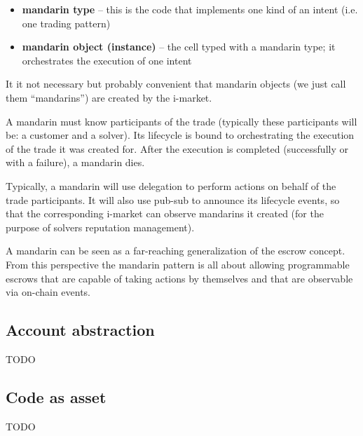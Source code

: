 \documentclass[a4paper]{article}
\begin{document}
\begin{itemize}
  \item \textbf{mandarin type} -- this is the code that implements one kind of an intent (i.e. one trading pattern)
  \item \textbf{mandarin object (instance)} -- the cell typed with a mandarin type; it orchestrates the execution of one intent
\end{itemize}

It it not necessary but probably convenient that mandarin objects (we just call them ``mandarins'') are created by the i-market.

A mandarin must know participants of the trade (typically these participants will be: a customer and a solver). Its lifecycle is bound to orchestrating the execution of the trade it was created for. After the execution is completed (successfully or with a failure), a mandarin dies.

Typically, a mandarin will use delegation to perform actions on behalf of the trade participants. It will also use pub-sub to announce its lifecycle events, so that the corresponding i-market can observe mandarins it created (for the purpose of solvers reputation management).

A mandarin can be seen as a far-reaching generalization of the escrow concept. From this perspective the mandarin pattern is all about allowing programmable escrows that are capable of taking actions by themselves and that are observable via on-chain events.

\subsection{Account abstraction}

TODO

\subsection{Code as asset}

TODO

\newpage

\begin{appendices}

\makeatletter
\renewcommand{\@seccntformat}[1]{%
  \@ifundefined{#1name}{}{\csname #1name\endcsname~}%
  \csname the#1\endcsname: }
\makeatother



\newpage



\newpage



\newpage



\end{appendices}
\end{document}
